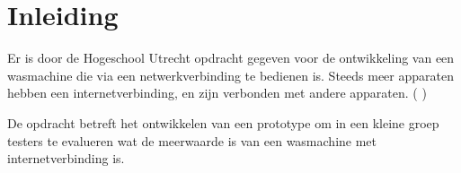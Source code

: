 \chapter{Inleiding}

Er is door de Hogeschool Utrecht opdracht gegeven voor de ontwikkeling van een wasmachine die via een netwerkverbinding te bedienen is. Steeds meer apparaten hebben een internetverbinding, en zijn verbonden met andere apparaten. ( \cite{wonenTussen100Sensoren} )

De opdracht betreft het ontwikkelen van een prototype om in een kleine groep testers te evalueren wat de meerwaarde is van een wasmachine met internetverbinding is. 